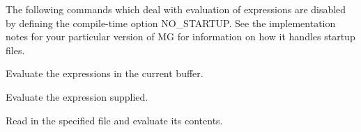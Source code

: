 The following commands which deal with evaluation of expressions are
disabled by defining the compile-time option NO\_STARTUP.  See the
implementation notes for your particular version of MG for information
on how it handles startup files. 

\fbody Evaluate the expressions in the current buffer.

\fbody Evaluate the expression supplied.

\fbody Read in the specified file and evaluate its contents.

\twocolumn[\Huge{\vspace{2em}{\bf Fundamental Mode Key Bindings}\vspace{1.5em}}]
